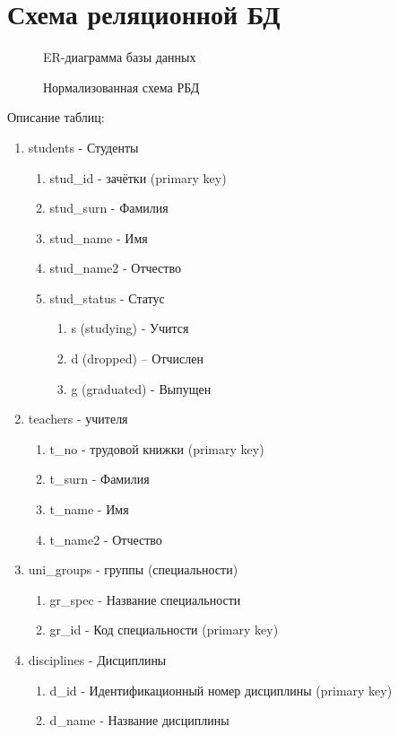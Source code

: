 \documentclass[zuevDbReport.tex]{subfiles}
\begin{document}
\section{Схема реляционной БД}
\begin{figure}[H]
\caption{ER-диаграмма базы данных}
\label{erdiagram}
\end{figure}
\begin{figure}[H]
\caption{Нормализованная схема РБД}
\label{erdiagram2}
\end{figure}
Описание таблиц:
\begin{enumerate}
\item{}students - Студенты
	\begin{enumerate}
	\item{}stud\_id -  \textnumero зачётки (primary key)
	\item{}stud\_surn - Фамилия
	\item{}stud\_name - Имя
	\item{}stud\_name2 - Отчество
	\item{}stud\_status - Статус
		\begin{enumerate}
		\item{}s (studying) - Учится
		\item{}d (dropped) – Отчислен
		\item{}g (graduated) - Выпущен
		\end{enumerate}
	\end{enumerate}

\newpage
\item{}teachers - учителя
	\begin{enumerate}
	\item{}t\_no - \textnumero трудовой книжки (primary key)
	\item{}t\_surn - Фамилия
	\item{}t\_name - Имя
	\item{}t\_name2 - Отчество
	\end{enumerate}

\item{}uni\_groups - группы (специальности)
	\begin{enumerate}
	\item{}gr\_spec - Название специальности
	\item{}gr\_id - Код специальности (primary key)
	\end{enumerate}

\item{}disciplines - Дисциплины
	\begin{enumerate}
	\item{}d\_id - Идентификационный номер дисциплины (primary key)
	\item{}d\_name - Название дисциплины
	\end{enumerate}


\end{enumerate}
\end{document}
